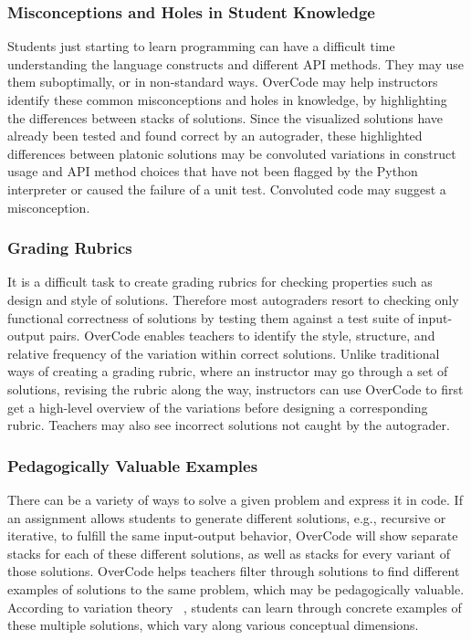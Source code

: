 \subsubsection{Misconceptions and Holes in Student Knowledge}
Students just starting to learn programming can have a difficult time understanding the language constructs and different API methods. They may use them suboptimally, or in non-standard ways. OverCode may help instructors identify these common misconceptions and holes in knowledge, by highlighting the differences between stacks of solutions. Since the visualized solutions have already been tested and found correct by an autograder, these highlighted differences between platonic solutions may be convoluted variations in construct usage and API method choices that have not been flagged by the Python interpreter or caused the failure of a unit test. Convoluted code may suggest a misconception.

\subsubsection{Grading Rubrics}
It is a difficult task to create grading rubrics for checking properties such as design and style of solutions. Therefore most autograders resort to checking only functional correctness of solutions by testing them against a test suite of input-output pairs. OverCode enables teachers to identify the style, structure, and relative frequency of the variation within correct solutions. Unlike traditional ways of creating a grading rubric, where an instructor may go through a set of solutions, revising the rubric along the way, instructors can use OverCode to first get a high-level overview of the variations before designing a corresponding rubric. Teachers may also see incorrect solutions not caught by the autograder.

\subsubsection{Pedagogically Valuable Examples} 
There can be a variety of ways to solve a given problem and express it in code. If an assignment allows students to generate different solutions, e.g., recursive or iterative, to fulfill the same input-output behavior, OverCode will show separate stacks for each of these different solutions, as well as stacks for every variant of those solutions. OverCode helps teachers filter through solutions to find different examples of solutions to the same problem, which may be pedagogically valuable. According to variation theory ~\cite{marton13}, students can learn through concrete examples of these multiple solutions, which vary along various conceptual dimensions.

